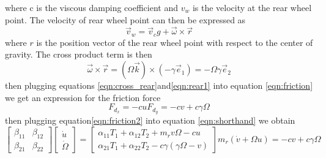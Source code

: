 \documentclass{article}
\begin{document}
	 where c is the viscous damping coefficient and $v_w$ is the velocity at the rear wheel point. The velocity of rear wheel point can then be expressed as 
	 \begin{equation}
	 \vec{v}_w = \vec{v}_cg + \vec{\omega}\times\vec{r}
	 \label{eqn:rear1}
	 \end{equation}
	 where $r$ is the position vector of the rear wheel point with respect to the center of gravity. The cross product term is then
	 \begin{equation}
	 \vec{\omega}\times\vec{r} = \left(\Omega\vec{k}\right)\times\left(-\gamma\vec{e}_1\right) =- \Omega\gamma \vec{e}_2
	 \label{eqn:cross_rear}
	 \end{equation}
	 then plugging equations \ref{eqn:cross_rear}and\ref{eqn:rear1} into equation \ref{eqn:friction} we get an expression for the friction force
	 \begin{subequations}
	 	\begin{equation}
	 	F_{d_{x}} = -cu
		\end{equation}
		\begin{equation}
		F_{d_{y}} = -cv+c\gamma\Omega
		\end{equation}
		\label{eqn:friction2}
	 \end{subequations}
	 then plugging equation\ref{eqn:friction2} into equation \ref{eqn:shorthand} we obtain
	 \begin{subequations}
	 	\begin{equation}
	 	\begin{bmatrix}
	 	\beta_{11} & \beta_{12}\\\beta_{21}&\beta_{22}
	 	\end{bmatrix}\begin{bmatrix}
	 	\dot{u}\\\dot{\Omega}
	 	\end{bmatrix} = \begin{bmatrix}
	 	\alpha_{11}T_{1}+\alpha_{12}T_2+m_rv\Omega-cu \\\alpha_{21}T_1+\alpha_{22}T_2-c\gamma\left(\gamma\Omega-v\right)
	 	\end{bmatrix}
	 	\end{equation}
	 	\begin{equation}
	 	m_r\left(\dot{v}+\Omega u\right) = -cv+c\gamma\Omega
	 	\end{equation}
	 	\label{eqn:shorthand2}
	 \end{subequations}
	 
\end{document}
